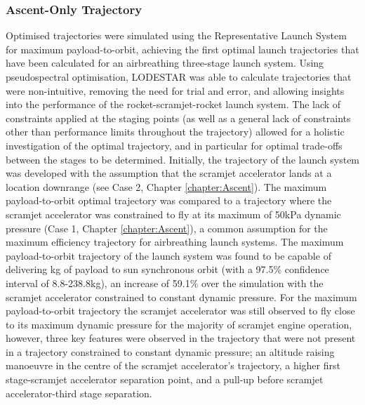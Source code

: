 \subsubsection{Ascent-Only Trajectory}
Optimised trajectories were simulated using the Representative Launch System for maximum payload-to-orbit, achieving the first optimal launch trajectories that have been calculated for an airbreathing three-stage launch system. Using pseudospectral optimisation, LODESTAR was able to calculate trajectories that were non-intuitive, removing the need for trial and error, and allowing insights into the performance of the rocket-scramjet-rocket launch system. The lack of constraints applied at the staging points (as well as a general lack of constraints other than performance limits throughout the trajectory) allowed for a holistic investigation of the optimal trajectory, and in particular for optimal trade-offs between the stages to be determined.
Initially, the trajectory of the launch system was developed with the assumption that the scramjet accelerator lands at a location downrange (see Case 2, Chapter \ref{chapter:Ascent}).
The maximum payload-to-orbit optimal trajectory was compared to a trajectory where the scramjet accelerator was constrained to fly at its maximum of 50kPa dynamic pressure (Case 1, Chapter \ref{chapter:Ascent}), a common assumption for the maximum efficiency trajectory for airbreathing launch systems. 
The maximum payload-to-orbit trajectory of the launch system was found to be capable of delivering \PayloadToOrbitStandardNoReturn kg of payload to sun synchronous orbit (with a 97.5\% confidence interval of 8.8-238.8kg), an increase of 59.1\% over the simulation with the scramjet accelerator constrained to constant dynamic pressure. For the maximum payload-to-orbit trajectory the scramjet accelerator was still observed to fly close to its maximum dynamic pressure for the majority of scramjet engine operation, however, three key features were observed in the trajectory that were not present in a trajectory constrained to constant dynamic pressure; an altitude raising manoeuvre in the centre of the scramjet accelerator's trajectory, a higher first stage-scramjet accelerator separation point, and a pull-up before scramjet accelerator-third stage separation.


